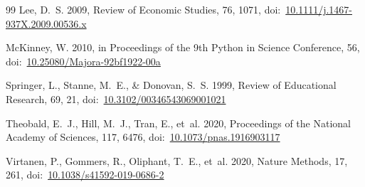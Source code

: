 \documentclass[10pt,twocolumn,letterpaper]{article}
\begin{document}
{\begin{thebibliography}{99}
Lee, D.~S. 2009, Review of Economic Studies, 76, 1071, doi:~\href{https://doi.org/10.1111/j.1467-937X.2009.00536.x}{10.1111/j.1467-937X.2009.00536.x}

McKinney, W. 2010, in Proceedings of the 9th Python in Science Conference, 56, doi:~\href{https://doi.org/10.25080/Majora-92bf1922-00a}{10.25080/Majora-92bf1922-00a}

Springer, L., Stanne, M.~E., \& Donovan, S.~S. 1999, Review of Educational Research, 69, 21, doi:~\href{https://doi.org/10.3102/00346543069001021}{10.3102/00346543069001021}

Theobald, E.~J., Hill, M.~J., Tran, E., et~al. 2020, Proceedings of the National Academy of Sciences, 117, 6476, doi:~\href{https://doi.org/10.1073/pnas.1916903117}{10.1073/pnas.1916903117}

Virtanen, P., Gommers, R., Oliphant, T.~E., et~al. 2020, Nature Methods, 17, 261, doi:~\href{https://doi.org/10.1038/s41592-019-0686-2}{10.1038/s41592-019-0686-2}
\end{thebibliography}}
\end{document}
